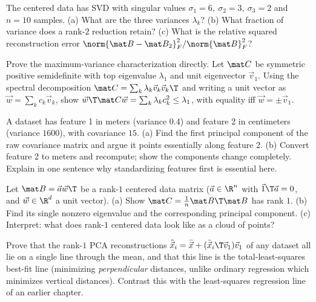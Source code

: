 \begin{exercise}\label{ch30:ex-svd}
The centered data has SVD with singular values $\sigma_1=6,\ \sigma_2=3,\
\sigma_3=2$ and $n=10$ samples. (a) What are the three variances $\lambda_k$?
(b) What fraction of variance does a rank-$2$ reduction retain? (c) What is the
relative squared reconstruction error $\norm{\mat B-\mat B_2}_F^2/\norm{\mat
B}_F^2$?
\end{exercise}

\begin{exercise}\label{ch30:ex-maxvar}
Prove the maximum-variance characterization directly. Let $\mat C$ be symmetric
positive semidefinite with top eigenvalue $\lambda_1$ and unit eigenvector
$\vec v_1$. Using the spectral decomposition $\mat C=\sum_k\lambda_k\vec v_k\vec
v_k\T$ and writing a unit vector as $\vec w=\sum_k c_k\vec v_k$, show
$\vec w\T\mat C\vec w=\sum_k\lambda_k c_k^2\le\lambda_1$, with equality iff
$\vec w=\pm\vec v_1$.
\end{exercise}

\begin{exercise}\label{ch30:ex-units}
A dataset has feature 1 in meters (variance $0.4$) and feature 2 in centimeters
(variance $1600$), with covariance $15$. (a) Find the first principal component of
the raw covariance matrix and argue it points essentially along feature 2.
(b) Convert feature 2 to meters and recompute; show the components change
completely. Explain in one sentence why standardizing features first is essential
here.
\end{exercise}

\begin{exercise}\label{ch30:ex-rank1}
Let $\mat B=\vec a\vec w\T$ be a rank-$1$ centered data matrix ($\vec a\in\R^n$
with $\vec 1\T\vec a=0$, and $\vec w\in\R^d$ a unit vector). (a) Show $\mat
C=\tfrac1n\mat B\T\mat B$ has rank $1$. (b) Find its single nonzero eigenvalue and
the corresponding principal component. (c) Interpret: what does rank-$1$ centered
data look like as a cloud of points?
\end{exercise}

\begin{exercise}\label{ch30:ex-recon-line}
Prove that the rank-$1$ PCA reconstructions $\hat{\vec x}_i=\bar{\vec
x}+(\tilde{\vec x}_i\T\vec v_1)\vec v_1$ of any dataset all lie on a single line
through the mean, and that this line is the total-least-squares best-fit line
(minimizing \emph{perpendicular} distances, unlike ordinary regression which
minimizes vertical distances). Contrast this with the least-squares regression line
of an earlier chapter.
\end{exercise}
